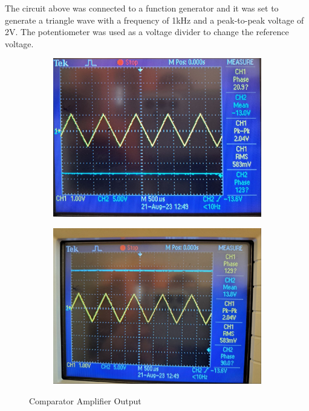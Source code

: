 \documentclass[12pt]{article}
\begin{document}
The circuit above was connected to a function generator and it was set to generate a triangle wave with a frequency of 1kHz and a peak-to-peak voltage of 2V. The potentiometer was used as a voltage divider to change the reference voltage.
\begin{figure}[H]
    \begin{subfigure}[b]{0.49\textwidth}
        \centering
        \includegraphics[width=\textwidth]{assets//main/2023-08-27-19-32-52.png}
    \end{subfigure}
    \begin{subfigure}[b]{0.49\textwidth}
        \centering
        \includegraphics[width=\textwidth]{assets//main/2023-08-27-19-37-42.png}
    \end{subfigure}
    \caption{Comparator Amplifier Output}
\end{figure}
\end{document}
